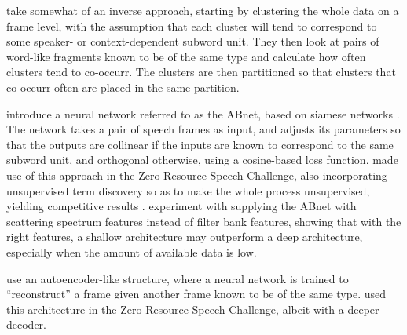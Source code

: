 \textcite{jansen2013weak} take somewhat of an inverse approach, starting by clustering the whole data on a frame level, with the assumption that each cluster will tend to correspond to some speaker- or context-dependent subword unit.
They then look at pairs of word-like fragments known to be of the same type and calculate how often clusters tend to co-occurr.
The clusters are then partitioned so that clusters that co-occurr often are placed in the same partition.

\textcite{synnaeve2014phonetics} introduce a neural network referred to as the ABnet, based on siamese networks \parencite{bromley1994signature}.
The network takes a pair of speech frames as input, and adjusts its parameters so that the outputs are collinear if the inputs are known to correspond to the same subword unit, and orthogonal otherwise, using a cosine-based loss function.
\textcite{thiolliere2015hybrid} made use of this approach in the Zero Resource Speech Challenge, also incorporating unsupervised term discovery so as to make the whole process unsupervised, yielding competitive results \parencite{versteegh2016zero}.
\textcite{zeghidour2016deep} experiment with supplying the ABnet with scattering spectrum features instead of filter bank features, showing that with the right features, a shallow architecture may outperform a deep architecture, especially when the amount of available data is low.

\textcite{kamper2015unsupervised} use an autoencoder-like structure, where a neural network is trained to ``reconstruct'' a frame given another frame known to be of the same type.
\textcite{renshaw2015comparison} used this architecture in the Zero Resource Speech Challenge, albeit with a deeper decoder.
